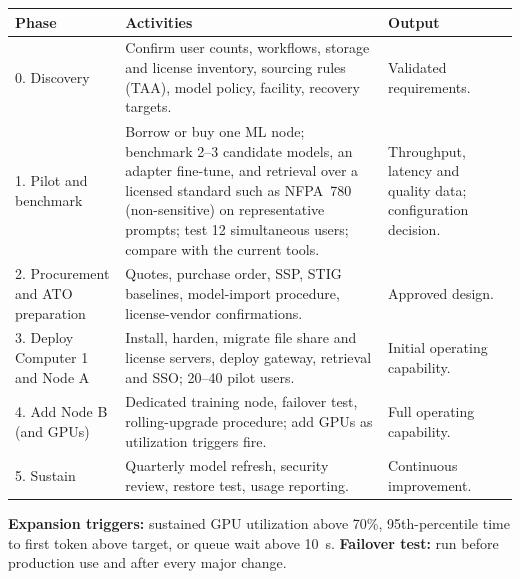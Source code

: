 
{\small
\begin{xltabular}{\textwidth}{@{}Y{0.545}Y{1.636}Y{0.819}@{}}
  \toprule
  Phase & Activities & Output \\
  \midrule
  . Discovery & Confirm user counts, workflows, storage and license inventory, sourcing rules (TAA), model policy, facility, recovery targets. & Validated requirements. \\
  1. Pilot and benchmark & Borrow or buy one ML node; benchmark 2--3 candidate models, an adapter fine-tune, and retrieval over a licensed standard such as NFPA~780 (non-sensitive) on representative prompts; test 12 simultaneous users; compare with the current tools. & Throughput, latency and quality data; configuration decision. \\
  2. Procurement and ATO preparation & Quotes, purchase order, SSP, STIG baselines, model-import procedure, license-vendor confirmations. & Approved design. \\
  3. Deploy Computer 1 and Node A & Install, harden, migrate file share and license servers, deploy gateway, retrieval and SSO; 20--40 pilot users. & Initial operating capability. \\
  4. Add Node B (and GPUs) & Dedicated training node, failover test, rolling-upgrade procedure; add GPUs as utilization triggers fire. & Full operating capability. \\
  5. Sustain & Quarterly model refresh, security review, restore test, usage reporting. & Continuous improvement. \\
  \bottomrule
\end{xltabular}}

\textbf{Expansion triggers:} sustained GPU utilization above 70\%, 95th-percentile time to first token above target,
or queue wait above 10~s. \textbf{Failover test:} run before production use and
after every major change.
